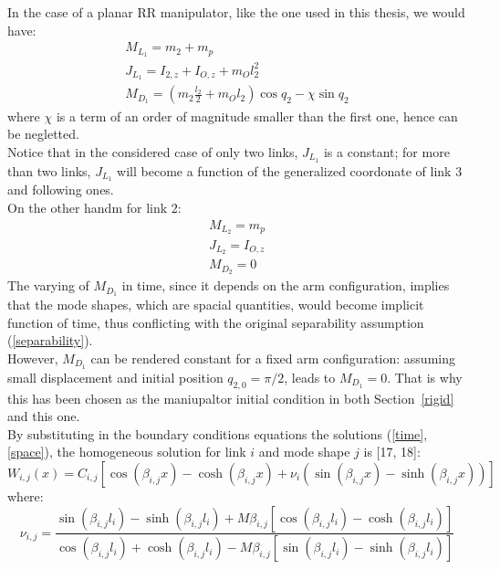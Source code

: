 \documentclass[a4paper,12pt,oneside]{report}
\begin{document}
In the case of a planar RR manipulator, like the one used in this thesis, we would have:
\begin{equation}
  \begin{array}{l}
    M_{L_1}=m_2+m_p\\
    J_{L_1}=I_{2,z}+I_{O,z}+m_Ol_2^2\\
    M_{D_1}=(m_2\frac{l_2}{2}+m_Ol_2)\cos{q_2}-\chi\sin{q_2}
  \end{array}
\end{equation}
where $\chi$ is a term of an order of magnitude smaller than the first one, hence can be negletted.\\
Notice that in the considered case of only two links, $J_{L_1}$ is a constant; for more than two links, $J_{L_1}$ will become a function of the generalized coordonate of link 3 and following ones.\\
On the other handm for link 2:
\begin{equation}
  \begin{array}{l}
    M_{L_2}=m_p\\
    J_{L_2}=I_{O,z}\\
    M_{D_2}=0
  \end{array}
\end{equation}
The varying of $M_{D_1}$ in time, since it depends on the arm configuration, implies that the mode shapes, which are spacial quantities, would become implicit function of time, thus conflicting with the original separability assumption (\ref{separability}).\\
However, $M_{D_1}$ can be rendered constant for a fixed arm configuration: assuming small displacement and initial position $q_{2,0}=\pi/2$, leads to $M_{D_1}=0$. That is why this has been chosen as the maniupaltor initial condition in both Section~\ref{rigid} and this one.\\
By substituting in the boundary conditions equations the solutions (\ref{time},\ref{space}), the homogeneous solution for link $i$ and mode shape $j$ is [17, 18]:
\begin{equation}
  W_{i,j}(x)=C_{i,j}[\cos{(\beta_{i,j} x)}-\cosh{(\beta_{i,j} x)}+\nu_i(\sin{(\beta_{i,j} x)}-\sinh{(\beta_{i,j} x)})]
  \label{lateral_solution}
\end{equation}
where:
\begin{equation}
  \nu_{i,j}=\frac{\sin{(\beta_{i,j}l_i)}-\sinh{(\beta_{i,j}l_i)}+M\beta_{i,j}[\cos{(\beta_{i,j}l_i)}-\cosh{(\beta_{i,j}l_i)}]}{\cos{(\beta_{i,j}l_i)}+\cosh{(\beta_{i,j}l_i)}-M\beta_{i,j}[\sin{(\beta_{i,j}l_i)}-\sinh{(\beta_{i,j}l_i)}]}
\end{equation}
\end{document}
